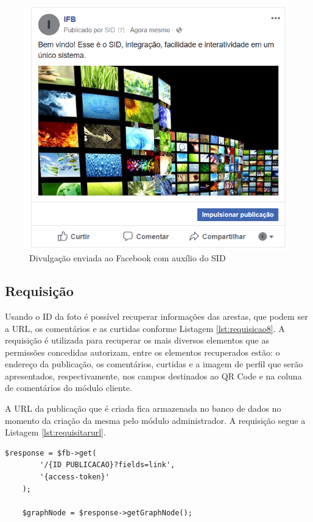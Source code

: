 \begin{figure}[H]
\centering
\includegraphics[scale=1.17]{figuras/imgfacebook1}
\caption{Divulgação enviada ao Facebook com auxílio do SID}
\label{fig:imgfacebook1}
\end{figure}


\subsection{Requisição}
Usando o ID da foto é possível recuperar informações das arestas, que podem ser a URL, os comentários e as curtidas conforme Listagem \ref{lst:requisicao8}. A requisição é utilizada para recuperar os mais diversos elementos que as permissões concedidas autorizam, entre os elementos recuperados estão: o endereço da publicação, os comentários, curtidas e a imagem de perfil que serão apresentados, respectivamente, nos campos destinados ao QR Code e na coluna de comentários do módulo cliente.

A URL da publicação que é criada fica armazenada no banco de dados no momento da criação da mesma pelo módulo administrador. A requisição segue a Listagem \ref{lst:requisitarurl}.

\begin{lstlisting}[caption={Foto de usuário},label={lst:requisitarurl},float]
  	$response = $fb->get(
    	'/{ID PUBLICACAO}?fields=link',
		'{access-token}'
	);
	
	$graphNode = $response->getGraphNode();
\end{lstlisting}

